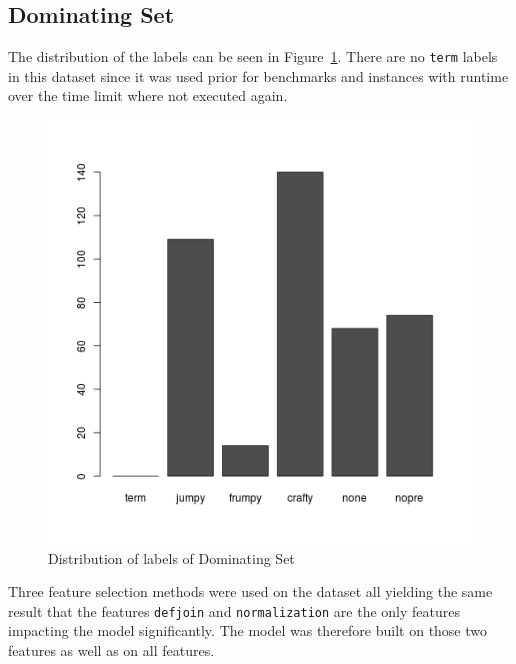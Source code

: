 \subsection{Dominating Set}
The distribution of the labels can be seen in Figure~\ref{fig:dsLabels}. There are no \lstinline$term$ labels in this dataset since it was used prior for benchmarks and instances with runtime over the time limit where not executed again.
\begin{figure}[h]
	\center
	\includegraphics[scale=0.4]{figures/domsetLabels.png}
	\caption{Distribution of labels of Dominating Set\label{fig:dsLabels}}
\end{figure}
\par Three feature selection methods were used on the dataset all yielding the same result that the features \lstinline$defjoin$ and \lstinline$normalization$ are the only features impacting the model significantly. The model was therefore built on those two features as well as on all features.

